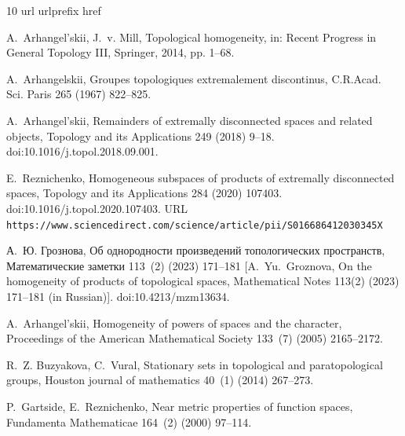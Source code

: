 \documentclass[preprint]{elsarticle}
\theoremstyle{definition}
\theoremstyle{remark}
\begin{document}

%


\begin{thebibliography}{10}
\expandafter\ifx\csname url\endcsname\relax
  \def\url#1{\texttt{#1}}\fi
\expandafter\ifx\csname urlprefix\endcsname\relax\def\urlprefix{URL }\fi
\expandafter\ifx\csname href\endcsname\relax
  \def\href#1#2{#2} \def\path#1{#1}\fi

A.~Arhangel’skii, J.~v. Mill, Topological homogeneity, in: Recent Progress in
  General Topology III, Springer, 2014, pp. 1--68.

A.~Arhangelskii, Groupes topologiques extremalement discontinus, C.R.Acad. Sci.
  Paris 265 (1967) 822--825.

A.~Arhangel'skii, Remainders of extremally disconnected spaces and related
  objects, Topology and its Applications 249 (2018) 9--18.
\newblock \href {https://doi.org/10.1016/j.topol.2018.09.001}
  {\path{doi:10.1016/j.topol.2018.09.001}}.

E.~Reznichenko,
  \href{https://www.sciencedirect.com/science/article/pii/S016686412030345X}{Homogeneous
  subspaces of products of extremally disconnected spaces}, Topology and its
  Applications 284 (2020) 107403.
\newblock \href {https://doi.org/10.1016/j.topol.2020.107403}
  {\path{doi:10.1016/j.topol.2020.107403}}.
\newline\urlprefix\url{https://www.sciencedirect.com/science/article/pii/S016686412030345X}

А.~Ю. Грознова, Об однородности
  произведений топологических пространств,
  Математические заметки 113~(2) (2023) 171--181
  [A.~Yu.~Groznova, On the homogeneity of products of topological spaces, Mathematical Notes 113(2) (2023) 171--181 (in Russian)].
\newblock \href {https://doi.org/10.4213/mzm13634}
  {\path{doi:10.4213/mzm13634}}.

A.~Arhangel’skii, Homogeneity of powers of spaces and the character,
  Proceedings of the American Mathematical Society 133~(7) (2005) 2165--2172.

R.~Z. Buzyakova, C.~Vural, Stationary sets in topological and paratopological
  groups, Houston journal of mathematics 40~(1) (2014) 267--273.

P.~Gartside, E.~Reznichenko, Near metric properties of function spaces,
  Fundamenta Mathematicae 164~(2) (2000) 97--114.


\end{thebibliography}
\end{document}
